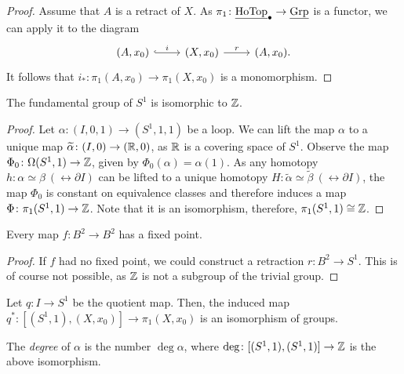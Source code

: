 
\begin{proof}
Assume that $A$ is a retract of $X$. As
$\pi_1 \colon \underline{\operatorname{HoTop}}_\bullet \to \underline{\operatorname{Grp}}$ is a functor, we
can apply it to the diagram
\[
\begin{tikzcd}
(A, x_0) \arrow[r, hook, "i"] &
(X, x_0) \arrow[r, "r"] &
(A, x_0).
\end{tikzcd}
\]
It follows that $i_* \colon \pi_1(A, x_0) \to \pi_1(X, x_0)$ is a
monomorphism.
\end{proof}

\begin{izrek}
The fundamental group of $S^1$ is isomorphic to $\mathbb{Z}$.
\end{izrek}

\begin{proof}
Let $\alpha \colon (I, 0, 1) \to (S^1, 1, 1)$ be a loop. We can
lift the map $\alpha$ to a unique map
$\widetilde{\alpha} \colon (I, 0) \to (\mathbb{R}, 0)$, as $\mathbb{R}$ is a
covering space of $S^1$. Observe the map
$\Phi_0 \colon \Omega(S^1, 1) \to \mathbb{Z}$, given by
$\Phi_0(\alpha) = \alpha(1)$. As any homotopy
$h \colon \alpha \simeq \beta~(\rel \partial I)$ can be lifted to a
unique homotopy $H \colon \widetilde{\alpha} \simeq
\widetilde{\beta}~(\rel \partial I)$, the map $\Phi_0$ is constant
on equivalence classes and therefore induces a map
$\Phi \colon \pi_1(S^1, 1) \to \mathbb{Z}$. Note that it is an isomorphism,
therefore, $\pi_1(S^1, 1) \cong \mathbb{Z}$.
\end{proof}

\begin{posledica}[Brouwer]
Every map $f \colon B^2 \to B^2$ has a fixed point.
\end{posledica}

\begin{proof}
If $f$ had no fixed point, we could construct a retraction
$r \colon B^2 \to S^1$. This is of course not possible, as $\mathbb{Z}$ is
not a subgroup of the trivial group.
\end{proof}

\begin{trditev}
Let $q \colon I \to S^1$ be the quotient map. Then, the induced map
$q^* \colon [(S^1, 1), (X, x_0)] \to \pi_1(X, x_0)$ is an
isomorphism of groups.
\end{trditev}

\begin{definicija}
The \emph{degree} of $\alpha$ is the number
$\deg \alpha$, where $\deg \colon [(S^1, 1), (S^1, 1)] \to \mathbb{Z}$ is
the above isomorphism.
\end{definicija}

